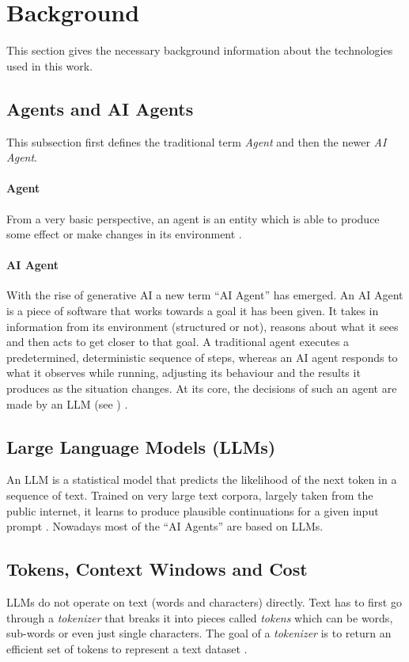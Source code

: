 \section{Background}
\label{sec:background}
This section gives the necessary background information about the technologies used in this work.

\subsection{Agents and AI Agents}
\label{sec:Agent_and_AI_Agents}
This subsection first defines the traditional term \emph{Agent} and then the newer \emph{AI Agent}.

\paragraph{Agent}
From a very basic perspective, an agent is an entity which is able to produce some effect or make changes in its
environment \parencite{CASTELFRANCHI1998157}.

\paragraph{AI Agent}
With the rise of generative AI a new term \enquote{AI Agent} has emerged.
An AI Agent is a piece of software that works towards a goal it has been given.
It takes in information from its environment (structured or not), reasons about what it sees and then
acts to get closer to that goal. A traditional agent executes a predetermined, deterministic
sequence of steps, whereas an AI agent responds to what it observes while running,
adjusting its behaviour and the results it produces as the situation changes. At its core, the decisions of such an
agent are made by an LLM (see ) \parencite{Sapkota_2026}.


\subsection{Large Language Models (LLMs)}
\label{sec:LLMs}
An LLM is a statistical model that predicts the likelihood of the next token in
a sequence of text. Trained on very large text corpora, largely taken from the
public internet, it learns to produce plausible continuations for a given input
prompt \parencite{douglas2023largelanguagemodels}. Nowadays most of the \enquote{AI Agents} are based on LLMs.


\subsection{Tokens, Context Windows and Cost}
\label{sec:tokens-context-cost}
LLMs do not operate on text (words and characters) directly. Text has to first go through a \emph{tokenizer} that breaks it into pieces called \emph{tokens}
which can be words, sub-words or even just single characters. The goal of a \emph{tokenizer} is to return an efficient set of tokens to represent a text dataset \parencite{alammar2024hands}.

